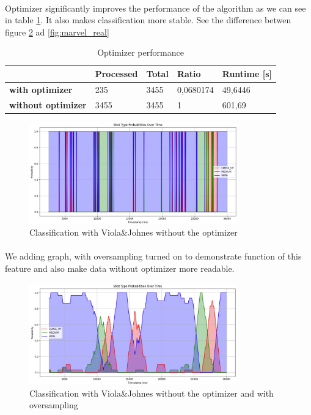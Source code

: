 \documentclass[english]{article}
\begin{document}
		\paragraph{}
			Optimizer significantly improves the performance of the algorithm as we can see in table \ref{marvel_opt}. It 
			also makes classification more stable. See the difference betwen figure \ref{fig:marvel_raw} ad \ref{fig:marvel_real}
		\begin{table}[H]
			\centering
			\begin{tabular}{|l|l|l|l|l|}
				\hline
				\textbf{}                  & \textbf{Processed} & \textbf{Total} & \textbf{Ratio} & \textbf{Runtime [s]} \\ \hline
				\textbf{with optimizer}    & 235                & 3455           & 0,0680174      & 49,6446          \\ \hline
				\textbf{without optimizer} & 3455               & 3455           & 1              & 601,69           \\ \hline
			\end{tabular}
			\caption{Optimizer performance}
			\label{marvel_opt}
		\end{table}

			\begin{figure}[H]
				\centering
				\includegraphics[width=0.8\textwidth]{figures/marvel_raw_graph.jpg}
				\caption{Classification with Viola\&Johnes without the optimizer}
				\label{fig:marvel_raw}
			\end{figure}

		\paragraph{}
			We adding graph, with oversampling turned on to demonstrate function of this feature and also
			make data without optimizer more readable.

			\begin{figure}[H]
				\centering
				\includegraphics[width=0.8\textwidth]{figures/marvel_oversampled_graph.jpg}
				\caption{Classification with Viola\&Johnes without the optimizer and with oversampling}
				\label{fig:marvel_raw}
			\end{figure}
\end{document}
